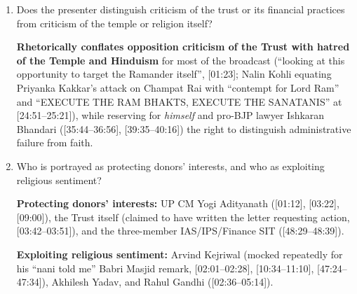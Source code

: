 \documentclass[10pt,a4paper]{article}
\begin{document}
\begin{enumerate}[leftmargin=1.5em, itemsep=6pt, topsep=4pt]
  \textbf{State/BJP defenses are amplified as the show's headline thesis}, with BJP's Nalin Kohli and Shantanu Gupta given extended turns to praise ``breakneck speed'' arrests ([12:47], [48:20--48:48], [49:37--50:40]). Meanwhile, \textbf{opposition counterarguments are derailed for over 20 minutes ([16:50--35:00] \& [46:18--48:02])} when AAP spokesperson Priyanka Kakkar makes a hyperbolically phrased demand (``Why are you shielding Champat and the bigger chors? Why should they not be publicly executed?'', [16:50])---which Arnab and Nalin Kohli seize upon as ``BREAKING NEWS'', ``TALIBAN'', ``lynch mob attitude'', and ``PART OF THE TALIBAN SHOOTING SQUAD'' ([17:13--22:35], [33:17--33:37]) to drown out her preceding factual questions about missing silver receipts and unmade public SIT reports!
  \item Does the presenter distinguish criticism of the trust or its financial practices from criticism of the temple or religion itself?\par\smallskip
  \textbf{Rhetorically conflates opposition criticism of the Trust with hatred of the Temple and Hinduism} for most of the broadcast (``looking at this opportunity to target the Ramander itself'', [01:23]; Nalin Kohli equating Priyanka Kakkar's attack on Champat Rai with ``contempt for Lord Ram'' and ``EXECUTE THE RAM BHAKTS, EXECUTE THE SANATANIS'' at [24:51--25:21]), while reserving for \emph{himself} and pro-BJP lawyer Ishkaran Bhandari ([35:44--36:56], [39:35--40:16]) the right to distinguish administrative failure from faith.
  \item Who is portrayed as protecting donors' interests, and who as exploiting religious sentiment?\par\smallskip
  \textbf{Protecting donors' interests:} UP CM Yogi Adityanath ([01:12], [03:22], [09:00]), the Trust itself (claimed to have written the letter requesting action, [03:42--03:51]), and the three-member IAS/IPS/Finance SIT ([48:29--48:39]).

  \textbf{Exploiting religious sentiment:} Arvind Kejriwal (mocked repeatedly for his ``nani told me'' Babri Masjid remark, [02:01--02:28], [10:34--11:10], [47:24--47:34]), Akhilesh Yadav, and Rahul Gandhi ([02:36--05:14]).
\end{enumerate}
\end{document}

